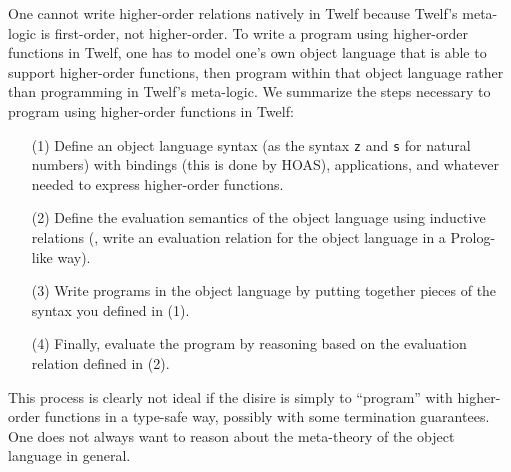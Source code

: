 One cannot write higher-order relations natively in Twelf
because Twelf's meta-logic is first-order, not higher-order.
To write a program using higher-order functions in Twelf, one has to model
one's own object language that is able to support higher-order functions,
then program within that object language rather than programming in
Twelf's meta-logic. We summarize the steps necessary to program
using higher-order functions in Twelf:
\begin{itemize}
\item[(1)] Define an object language syntax
        (as the syntax \texttt{z} and \texttt{s} for natural numbers)
        with bindings (this is done by HOAS), applications, and whatever
        needed to express higher-order functions.
\item[(2)] Define the evaluation semantics of the object language using
        inductive relations (\ie, write an evaluation relation for
        the object language in a Prolog-like way).
\item[(3)] Write programs in the object language by putting
        together pieces of the syntax you defined in (1).
\item[(4)] Finally, evaluate the program by reasoning based on
        the evaluation relation defined in (2).
\end{itemize}
This process is clearly not ideal if the disire is simply to ``program''
with higher-order functions in a type-safe way, possibly with some
termination guarantees. One does not always want to reason about
the meta-theory of the object language in general.

